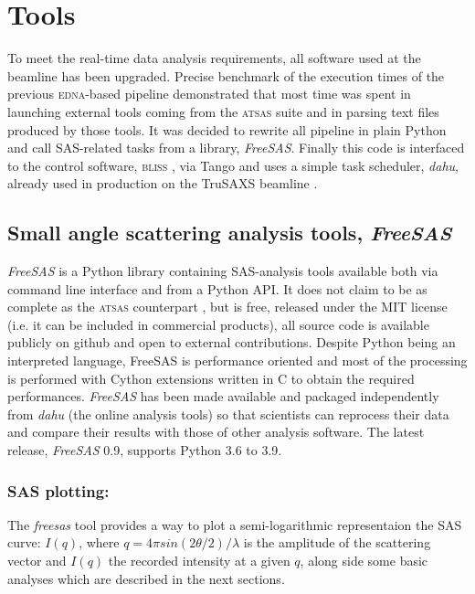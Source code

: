 \documentclass[preprint]{iucr}              %
\begin{document}
\section{Tools}

To meet the real-time data analysis requirements, all software used at the beamline has been upgraded.
Precise benchmark of the execution times of the previous \textsc{edna}-based pipeline demonstrated that 
most time was spent in launching external tools coming from the \textsc{atsas} suite and in parsing text files produced by those tools.
It was decided to rewrite all pipeline in plain Python \cite{python} and call SAS-related tasks from a library, \textit{FreeSAS}. 
Finally this code is interfaced to the control software, \textsc{bliss} \cite{bliss}, via Tango \cite{tango} and uses a simple task scheduler, \textit{dahu}, already used in production on the TruSAXS beamline \cite{id02_2022}.

\subsection{Small angle scattering analysis tools, \textit{FreeSAS}}

\textit{FreeSAS} is a Python library containing SAS-analysis tools available both via command line interface and from a Python API. 
It does not claim to be as complete as the \textsc{atsas} counterpart \cite{ATSAS3},
but is free, released under the MIT license (i.e. it can be included in commercial products), all source code is available publicly on github \cite{freesas} and
open to external contributions.
Despite Python being an interpreted language, FreeSAS is performance oriented and most of the processing is performed with Cython \cite{cython} extensions written in C to obtain the required performances. 
\textit{FreeSAS} has been made available and packaged independently from \textit{dahu} (the online analysis tools) so that scientists can reprocess their data and compare their results with those of other analysis software. 
The latest release, \textit{FreeSAS} 0.9, supports Python 3.6 to 3.9.

\subsubsection{SAS plotting:} The \textit{freesas} tool provides a way to plot a semi-logarithmic representaion the SAS curve: $I(q)$, where $q = 4\pi sin(2\theta/2)/\lambda$ is the amplitude of the scattering vector and $I(q)$ the recorded intensity at a given $q$, along side some basic analyses which are described in the next sections.
\end{document}
